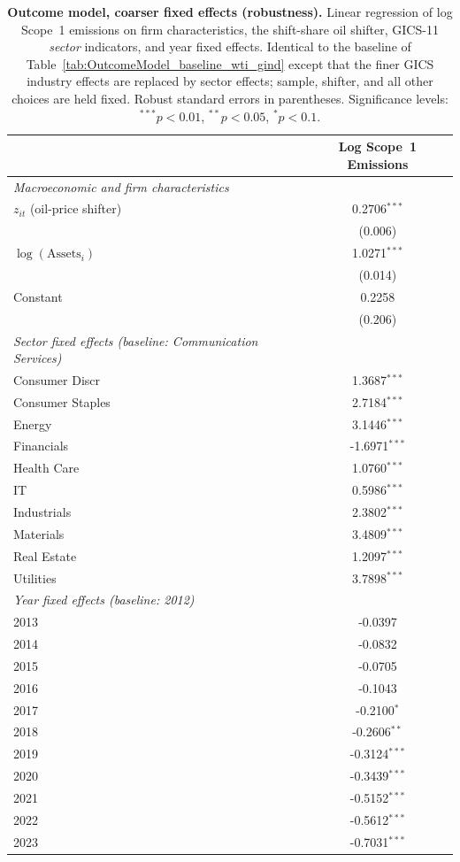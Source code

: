 \documentclass[a4paper,12pt]{article}
\begin{document}
\begin{table}[htbp]
\footnotesize
\centering
\caption{\textbf{Outcome model, coarser fixed effects (robustness).} Linear regression of log Scope~1 emissions on firm characteristics, the shift-share oil shifter, GICS-11 \emph{sector} indicators, and year fixed effects. Identical to the baseline of Table~\ref{tab:OutcomeModel_baseline_wti_gind} except that the finer GICS industry effects are replaced by sector effects; sample, shifter, and all other choices are held fixed. Robust standard errors in parentheses. Significance levels: $^{***}p<0.01$, $^{**}p<0.05$, $^{*}p<0.1$.}
\label{tab:OutcomeModel_baseline_wti_gsec}
\begin{tabular}{l c}
\toprule
 & Log Scope~1 Emissions \\
\midrule
\textit{Macroeconomic and firm characteristics} \\
$z_{it}$ (oil-price shifter) & 0.2706$^{***}$ \\
      & (0.006) \\
$\log(\mathrm{Assets}_i)$ & 1.0271$^{***}$ \\
      & (0.014) \\
Constant & 0.2258 \\
      & (0.206) \\

\midrule
\textit{Sector fixed effects (baseline: Communication Services)} \\
Consumer Discr & 1.3687$^{***}$ \\
Consumer Staples & 2.7184$^{***}$ \\
Energy & 3.1446$^{***}$ \\
Financials & -1.6971$^{***}$ \\
Health Care & 1.0760$^{***}$ \\
IT & 0.5986$^{***}$ \\
Industrials & 2.3802$^{***}$ \\
Materials & 3.4809$^{***}$ \\
Real Estate & 1.2097$^{***}$ \\
Utilities & 3.7898$^{***}$ \\

\midrule
\textit{Year fixed effects (baseline: 2012)} \\
2013 & -0.0397 \\
2014 & -0.0832 \\
2015 & -0.0705 \\
2016 & -0.1043 \\
2017 & -0.2100$^{*}$ \\
2018 & -0.2606$^{**}$ \\
2019 & -0.3124$^{***}$ \\
2020 & -0.3439$^{***}$ \\
2021 & -0.5152$^{***}$ \\
2022 & -0.5612$^{***}$ \\
2023 & -0.7031$^{***}$ \\


\end{tabular}
\end{table}
\end{document}

